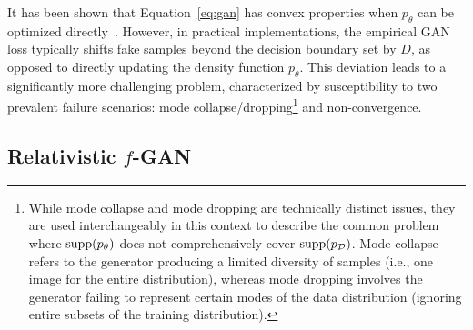 It has been shown that Equation~\ref{eq:gan} has convex properties when $p_\theta$ can be optimized directly~\cite{gan,rpgan}. However, in practical implementations, the empirical GAN loss typically shifts fake samples beyond the decision boundary set by $D$, as opposed to directly updating the density function $p_\theta$. This deviation leads to a significantly more challenging problem, characterized by susceptibility to two prevalent failure scenarios: mode collapse/dropping\footnote{While mode collapse and mode dropping are technically distinct issues, they are used interchangeably in this context to describe the common problem where $\operatorname{supp}(p_\theta)$ does not comprehensively cover $\operatorname{supp}(p_\mathcal{D})$. Mode collapse refers to the generator producing a limited diversity of samples (i.e., one image for the entire distribution), whereas mode dropping involves the generator failing to represent certain modes of the data distribution (ignoring entire subsets of the training distribution).} and non-convergence.



\subsection{Relativistic \texorpdfstring{$f$-GAN}{f-GAN}}

